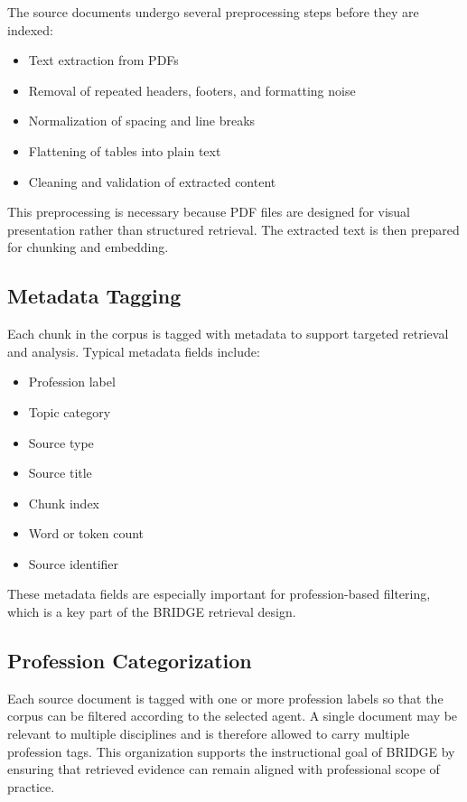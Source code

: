 \documentclass[12pt]{article}
\begin{document}
The source documents undergo several preprocessing steps before they are indexed:

\begin{itemize}[leftmargin=1.5em]
    \item Text extraction from PDFs
    \item Removal of repeated headers, footers, and formatting noise
    \item Normalization of spacing and line breaks
    \item Flattening of tables into plain text
    \item Cleaning and validation of extracted content
\end{itemize}

This preprocessing is necessary because PDF files are designed for visual presentation rather than structured retrieval. The extracted text is then prepared for chunking and embedding.

\subsection{Metadata Tagging}

Each chunk in the corpus is tagged with metadata to support targeted retrieval and analysis. Typical metadata fields include:

\begin{itemize}[leftmargin=1.5em]
    \item Profession label
    \item Topic category
    \item Source type
    \item Source title
    \item Chunk index
    \item Word or token count
    \item Source identifier
\end{itemize}

These metadata fields are especially important for profession-based filtering, which is a key part of the BRIDGE retrieval design.

\subsection{Profession Categorization}

Each source document is tagged with one or more profession labels so that the corpus can be filtered according to the selected agent. A single document may be relevant to multiple disciplines and is therefore allowed to carry multiple profession tags. This organization supports the instructional goal of BRIDGE by ensuring that retrieved evidence can remain aligned with professional scope of practice.
\end{document}
